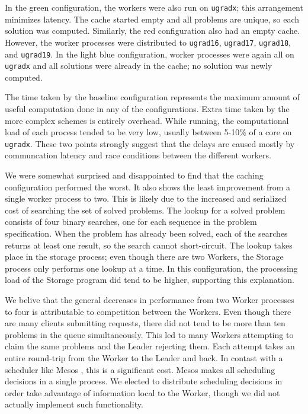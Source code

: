 \documentclass[12pt]{article}
\begin{document}
In the green configuration, the workers were also run on \verb!ugradx!; this arrangement minimizes latency.
The cache started empty and all problems are unique, so each solution was computed.
Similarly, the red configuration also had an empty cache.
However, the worker processes were distributed to \verb!ugrad16!, \verb!ugrad17!, \verb!ugrad18!, and \verb!ugrad19!.
In the light blue configuration, worker processes were again all on \verb!ugradx! and all solutions were already in the cache; no solution was newly computed.

The time taken by the baseline configuration represents the maximum amount of useful computation done in any of the configurations.
Extra time taken by the more complex schemes is entirely overhead.
While running, the computational load of each process tended to be very low, usually between 5-10\% of a core on \verb!ugradx!.
These two points strongly suggest that the delays are caused mostly by communcation latency and race conditions between the different workers.

We were somewhat surprised and disappointed to find that the caching configuration performed the worst.
It also shows the least improvement from a single worker process to two.
This is likely due to the increased and serialized cost of searching the set of solved problems.
The lookup for a solved problem consists of four binary searches, one for each sequence in the problem specification.
When the problem has already been solved, each of the searches returns at least one result, so the search cannot short-circuit.
The lookup takes place in the storage process; even though there are two Workers, the Storage process only performs one lookup at a time.
In this configuration, the processing load of the Storage program did tend to be higher, supporting this explanation.

We belive that the general decreases in performance from two Worker processes to four is attributable to competition between the Workers.
Even though there are many clients submitting requests, there did not tend to be more than ten problems in the queue simultaneously.
This led to many Workers attempting to claim the same problems and the Leader rejecting them.
Each attempt takes an entire round-trip from the Worker to the Leader and back.
In contast with a scheduler like Mesos \cite{Mesos}, this is a significant cost.
Mesos makes all scheduling decisions in a single process.
We elected to distribute scheduling decisions in order take advantage of information local to the Worker, though we did not actually implement such functionality.
\end{document}
